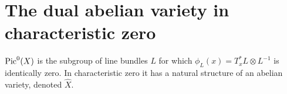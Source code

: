 \section{The dual abelian variety in characteristic zero}
\label{mumford-source-II8}

\begin{definition}
\label{mumford-def-piczero}
$\operatorname{Pic}^0(X)$ is the subgroup of line bundles $L$ for which
$\phi_L(x)=T_x^*L\otimes L^{-1}$ is identically zero. In characteristic zero
it has a natural structure of an abelian variety, denoted $\widehat X$.
\notready
\end{definition}

